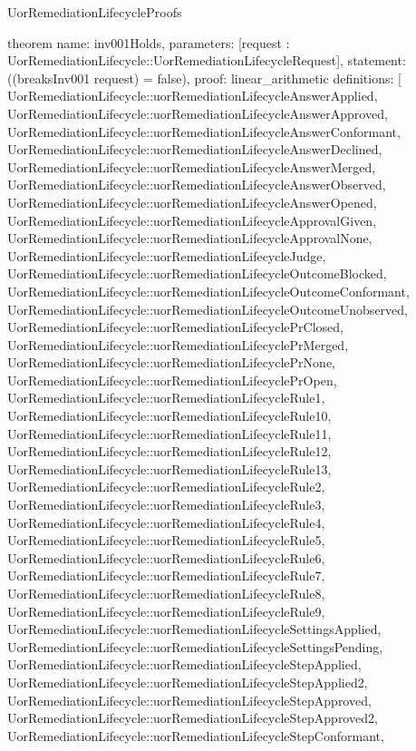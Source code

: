 \begin{lexlean}{UorRemediationLifecycleProofs}
\begin{semanticmodule}
theorem{
  name: inv001Holds,
  parameters: [request : UorRemediationLifecycle::UorRemediationLifecycleRequest],
  statement: ((breaksInv001 request) = false),
  proof: linear_arithmetic{
    definitions: [
      UorRemediationLifecycle::uorRemediationLifecycleAnswerApplied,
      UorRemediationLifecycle::uorRemediationLifecycleAnswerApproved,
      UorRemediationLifecycle::uorRemediationLifecycleAnswerConformant,
      UorRemediationLifecycle::uorRemediationLifecycleAnswerDeclined,
      UorRemediationLifecycle::uorRemediationLifecycleAnswerMerged,
      UorRemediationLifecycle::uorRemediationLifecycleAnswerObserved,
      UorRemediationLifecycle::uorRemediationLifecycleAnswerOpened,
      UorRemediationLifecycle::uorRemediationLifecycleApprovalGiven,
      UorRemediationLifecycle::uorRemediationLifecycleApprovalNone,
      UorRemediationLifecycle::uorRemediationLifecycleJudge,
      UorRemediationLifecycle::uorRemediationLifecycleOutcomeBlocked,
      UorRemediationLifecycle::uorRemediationLifecycleOutcomeConformant,
      UorRemediationLifecycle::uorRemediationLifecycleOutcomeUnobserved,
      UorRemediationLifecycle::uorRemediationLifecyclePrClosed,
      UorRemediationLifecycle::uorRemediationLifecyclePrMerged,
      UorRemediationLifecycle::uorRemediationLifecyclePrNone,
      UorRemediationLifecycle::uorRemediationLifecyclePrOpen,
      UorRemediationLifecycle::uorRemediationLifecycleRule1,
      UorRemediationLifecycle::uorRemediationLifecycleRule10,
      UorRemediationLifecycle::uorRemediationLifecycleRule11,
      UorRemediationLifecycle::uorRemediationLifecycleRule12,
      UorRemediationLifecycle::uorRemediationLifecycleRule13,
      UorRemediationLifecycle::uorRemediationLifecycleRule2,
      UorRemediationLifecycle::uorRemediationLifecycleRule3,
      UorRemediationLifecycle::uorRemediationLifecycleRule4,
      UorRemediationLifecycle::uorRemediationLifecycleRule5,
      UorRemediationLifecycle::uorRemediationLifecycleRule6,
      UorRemediationLifecycle::uorRemediationLifecycleRule7,
      UorRemediationLifecycle::uorRemediationLifecycleRule8,
      UorRemediationLifecycle::uorRemediationLifecycleRule9,
      UorRemediationLifecycle::uorRemediationLifecycleSettingsApplied,
      UorRemediationLifecycle::uorRemediationLifecycleSettingsPending,
      UorRemediationLifecycle::uorRemediationLifecycleStepApplied,
      UorRemediationLifecycle::uorRemediationLifecycleStepApplied2,
      UorRemediationLifecycle::uorRemediationLifecycleStepApproved,
      UorRemediationLifecycle::uorRemediationLifecycleStepApproved2,
      UorRemediationLifecycle::uorRemediationLifecycleStepConformant,
}}
\end{semanticmodule}
\end{lexlean}
